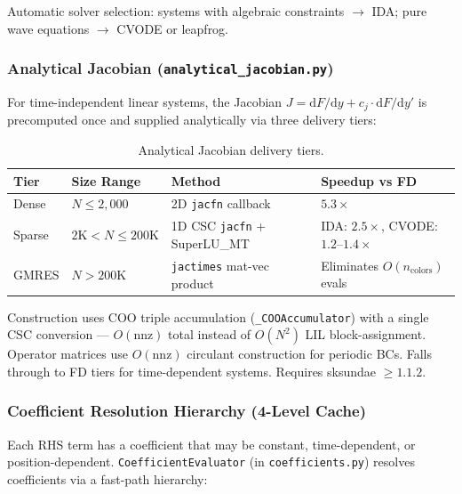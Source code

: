 Automatic solver selection: systems with algebraic constraints $\to$ IDA; pure wave equations $\to$ CVODE or leapfrog.

\subsubsection{Analytical Jacobian (\texttt{analytical\_jacobian.py})}
\label{sec:analytical-jacobian}

For time-independent linear systems, the Jacobian $J = \mathrm{d}F/\mathrm{d}y + c_j \cdot \mathrm{d}F/\mathrm{d}y'$
is precomputed once and supplied analytically via three delivery tiers:

\begin{table}[htbp]
\centering
\caption{Analytical Jacobian delivery tiers.}
\label{tab:jacobian-tiers}
\begin{tabular}{@{}llll@{}}
\toprule
Tier & Size Range & Method & Speedup vs FD \\
\midrule
Dense & $N \leq 2{,}000$ & 2D \texttt{jacfn} callback & $5.3\times$ \\
Sparse & $2\text{K} < N \leq 200\text{K}$ & 1D CSC \texttt{jacfn} + SuperLU\_MT & IDA: $2.5\times$, CVODE: $1.2$--$1.4\times$ \\
GMRES & $N > 200\text{K}$ & \texttt{jactimes} mat-vec product & Eliminates $O(n_\text{colors})$ evals \\
\bottomrule
\end{tabular}
\end{table}

Construction uses COO triple accumulation (\texttt{\_COOAccumulator}) with a single
CSC conversion --- $O(\text{nnz})$ total instead of $O(N^2)$ LIL block-assignment.
Operator matrices use $O(\text{nnz})$ circulant construction for periodic BCs.
Falls through to FD tiers for time-dependent systems. Requires sksundae $\geq 1.1.2$.

\subsubsection{Coefficient Resolution Hierarchy (4-Level Cache)}
\label{sec:coefficient-cache}

Each RHS term has a coefficient that may be constant, time-dependent, or position-dependent.
\texttt{CoefficientEvaluator} (in \texttt{coefficients.py}) resolves coefficients via a fast-path hierarchy:

